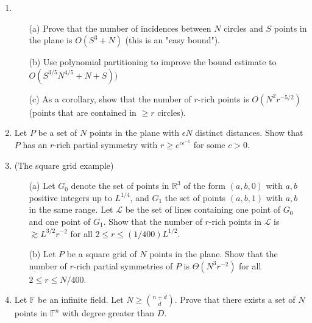 \documentclass{article}
\newcommand{\FF}{\mathbb{F}}
\newcommand{\RR}{\mathbb{R}}
\begin{document}
\begin{enumerate}
\item
\begin{enumerate}
\item[(a)] Prove that the number of incidences between $N$ circles and $S$ points in the plane is $O(S^3 + N)$ (this is an "easy bound").
\item[(b)] Use polynomial partitioning to improve the bound estimate to $O(S^{3/5} N^{4/5} + N + S))$
\item[(c)] As a corollary, show that the number of $r$-rich points is $O(N^2 r^{-5/2})$ (points that are contained in $\ge r$ circles).
\end{enumerate}


\item

Let $P$ be a set of $N$ points in the plane with $\epsilon N$ distinct distances. Show that $P$ has an $r$-rich partial symmetry with $r \ge e^{c\epsilon^{-1}}$ for some $c > 0$.

\item

(The square grid example)
\begin{enumerate}
\item[(a)] Let $G_0$ denote the set of points in $\RR^3$ of the form $(a,b,0)$ with $a,b$ positive integers up to $L^{1/4}$, and $G_1$ the set of points $(a,b,1)$ with $a,b$ in the same range. Let $\mathcal{L}$ be the set of lines containing one point of $G_0$ and one point of $G_1$. Show that the number of $r$-rich points in $\mathcal{L}$ is $\gtrsim L^{3/2}r^{-2}$ for all $2 \le r \le (1/400) L^{1/2}$.
\item[(b)] Let $P$ be a square grid of $N$ points in the plane. Show that the number of $r$-rich partial symmetries of $P$ is $\Theta(N^3r^{-2})$ for all $2 \le r \le N/400$.
\end{enumerate}

\item

Let $\FF$ be an infinite field. Let $N \ge \binom{n+d}{d}$. Prove that there exists a set of $N$ points in $\FF^n$ with degree greater than $D$.

\end{enumerate}
\end{document}
